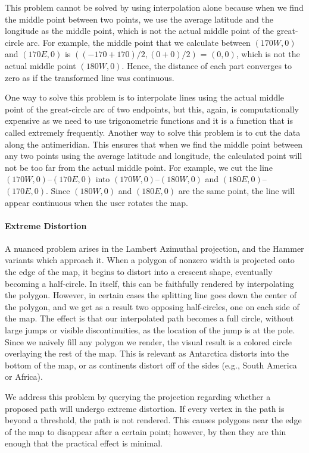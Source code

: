 This problem cannot be solved by using interpolation alone because when we find the middle point between two points, we use the average latitude and the longitude as the middle point, which is not the actual middle point of the great-circle arc. For example, the middle point that we calculate between $(170W, 0)$ and $(170E, 0)$ is $((-170+170)/2,(0+0)/2)$ = $(0, 0)$, which is not the actual middle point $(180W, 0)$. Hence, the distance of each part converges to zero as if the transformed line was continuous.

One way to solve this problem is to interpolate lines using the actual middle point of the great-circle arc of two endpoints, but this, again, is computationally expensive as we need to use trigonometric functions and it is a function that is called extremely frequently. Another way to solve this problem is to cut the data along the antimeridian. This ensures that when we find the middle point between any two points using the average latitude and longitude, the calculated point will not be too far from the actual middle point. For example, we cut the line $(170W, 0)$--$(170E, 0)$ into $(170W, 0)$--$(180W, 0)$  and $(180E, 0)$--$(170E, 0)$. Since $(180W, 0)$ and $(180E, 0)$ are the same point, the line will appear continuous when the user rotates the map.

\paragraph{Extreme Distortion}
A nuanced problem arises in the Lambert Azimuthal projection, and the Hammer
  variants which approach it.
When a polygon of nonzero width is projected onto the edge of the map, it
  begins to distort into a crescent shape, eventually becoming a half-circle.
In itself, this can be faithfully rendered by interpolating the polygon.
However, in certain cases the splitting line goes down the center of the
  polygon, and we get as a result two opposing half-circles, one on each side
  of the map.
The effect is that our interpolated path becomes a full circle, without large
  jumps or visible discontinuities, as the location of the jump is at the pole.
Since we naively fill any polygon we render, the visual result is a colored
  circle overlaying the rest of the map.
This is relevant as Antarctica distorts into the bottom of the map, or as
  continents distort off of the sides (e.g., South America or Africa).

We address this problem by querying the projection regarding whether a
  proposed path will undergo extreme distortion.
If every vertex in the path is beyond a threshold, the path is not rendered.
This causes polygons near the edge of the map to disappear after a certain
  point; however, by then they are thin enough that the practical effect is
  minimal.

